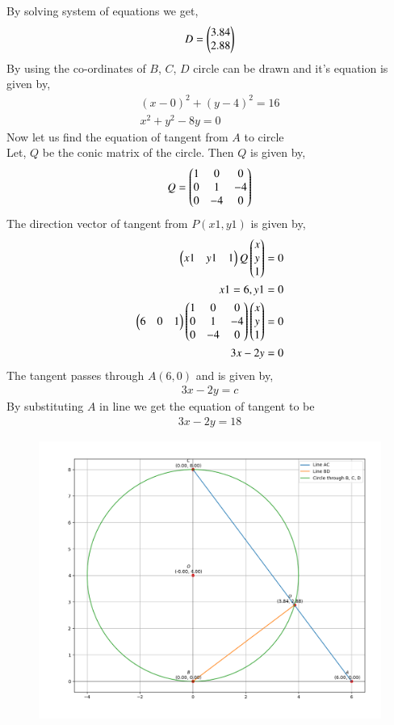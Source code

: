 \documentclass[journal]{IEEEtran}
\begin{document}
By solving system of equations we get,
\begin{align}
    D=\begin{pmatrix}3.84\\2.88\end{pmatrix}
\end{align}
By using the co-ordinates of $B$, $C$, $D$ circle can be drawn and it's equation is given by,
\begin{align}
    (x-0)^{2}+(y-4)^{2}=16 \\
    x^2+y^2-8y=0
\end{align}
Now let us find the equation of tangent from $A$ to circle \\
Let, $Q$ be the conic matrix of the circle. Then $Q$ is given by,
\begin{align}
    Q=\begin{pmatrix}1&0&0\\0&1&-4\\0&-4&0\end{pmatrix}
\end{align}
The direction vector of tangent from $P(x1,y1)$ is given by,
\begin{align}
    \begin{pmatrix}x1&y1&1\end{pmatrix}Q\begin{pmatrix}x\\y\\1\end{pmatrix} =0\\
    x1=6,y1=0\\
    \begin{pmatrix}6&0&1\end{pmatrix}\begin{pmatrix}1&0&0\\0&1&-4\\0&-4&0\end{pmatrix}\begin{pmatrix}x\\y\\1\end{pmatrix} =0\\
    3x-2y=0
\end{align}
The tangent passes through $A(6,0)$ and is given by,
\begin{align}
    3x-2y=c
\end{align}
By substituting $A$ in line we get the equation of tangent to be 
\begin{align}
    3x-2y=18
\end{align}
\begin{figure}[h!]
   \centering
   \includegraphics[width=0.7\linewidth]{figure_1.png}
   \label{stemplot}
\end{figure}
\end{document}
